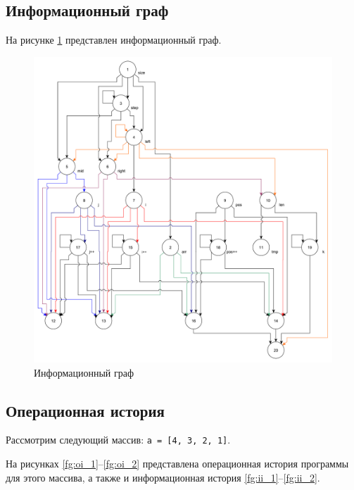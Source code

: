 \subsection{Информационный граф}

На рисунке \ref{fg:ig} представлен информационный граф.

\begin{figure}[h]
	\centering
	\includegraphics[height=0.6\textheight]{img/информационный_граф.pdf}
	\caption{Информационный граф}
	\label{fg:ig}
\end{figure}

\clearpage

\subsection{Операционная история}

Рассмотрим следующий массив: \texttt{a = [4, 3, 2, 1]}.

На рисунках \ref{fg:oi_1}--\ref{fg:oi_2} представлена операционная история программы для этого массива, а также и информационная история \ref{fg:ii_1}--\ref{fg:ii_2}.

